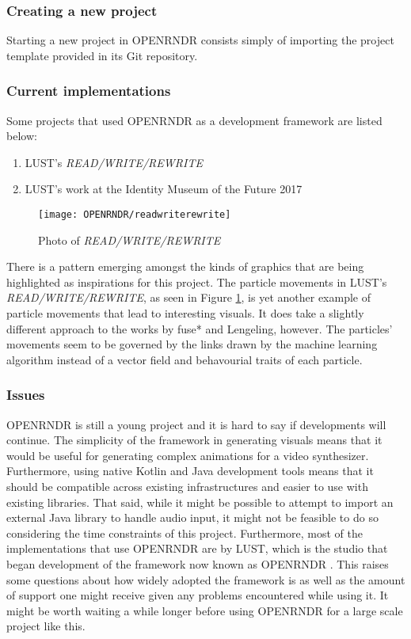 \documentclass[../../initial_thesis.tex]{subfiles}
\begin{document}
\subsubsection{Creating a new project}
Starting a new project in OPENRNDR consists simply of importing the project template provided in its Git repository.
\subsubsection{Current implementations}
Some projects that used OPENRNDR as a development framework are listed below:

\begin{enumerate}
\item LUST's \textit{READ/WRITE/REWRITE} \cite{ORml}
\item LUST's work at the Identity Museum of the Future 2017 \cite{ORbinpacking}
\end{enumerate}

\begin{figure}
  \texttt{[image: OPENRNDR/readwriterewrite]}
  \centering
  \caption{Photo of \textit{READ/WRITE/REWRITE} \cite{ORml}}
  \label{fig:readwriterewrite}
\end{figure}

There is a pattern emerging amongst the kinds of graphics that are being highlighted as inspirations for this project. The particle movements in LUST's \textit{READ/WRITE/REWRITE}, as seen in Figure \ref{fig:readwriterewrite}, is yet another example of particle movements that lead to interesting visuals. It does take a slightly different approach to the works by fuse* and Lengeling, however. The particles' movements seem to be governed by the links drawn by the machine learning algorithm instead of a vector field and behavourial traits of each particle.

\subsubsection{Issues}
OPENRNDR is still a young project and it is hard to say if developments will continue. The simplicity of the framework in generating visuals means that it would be useful for generating complex animations for a video synthesizer. Furthermore, using native Kotlin and Java development tools means that it should be compatible across existing infrastructures and easier to use with existing libraries. That said, while it might be possible to attempt to import an external Java library to handle audio input, it might not be feasible to do so considering the time constraints of this project. Furthermore, most of the implementations that use OPENRNDR are by LUST, which is the studio that began development of the framework now known as OPENRNDR \cite{ORsite}. This raises some questions about how widely adopted the framework is as well as the amount of support one might receive given any problems encountered while using it. It might be worth waiting a while longer before using OPENRNDR for a large scale project like this.
\end{document}
